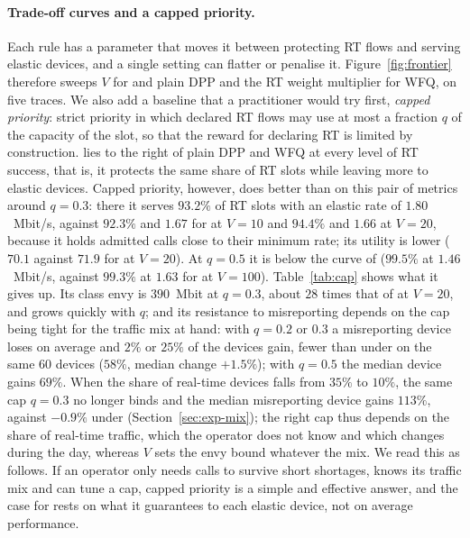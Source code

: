 \paragraph{Trade-off curves and a capped priority.}
Each rule has a parameter that moves it between protecting RT flows and serving elastic devices, and a single setting can flatter or penalise it.
Figure~\ref{fig:frontier} therefore sweeps $V$ for \repay{} and plain DPP and the RT weight multiplier for \textsc{WFQ}, on five traces.
We also add a baseline that a practitioner would try first, \emph{capped priority}: strict priority in which declared RT flows may use at most a fraction $q$ of the capacity of the slot, so that the reward for declaring RT is limited by construction.
\repay{} lies to the right of plain DPP and \textsc{WFQ} at every level of RT success, that is, it protects the same share of RT slots while leaving more to elastic devices.
Capped priority, however, does better than \repay{} on this pair of metrics around $q=0.3$: there it serves $93.2\%$ of RT slots with an elastic rate of $1.80$~Mbit/s, against $92.3\%$ and $1.67$ for \repay{} at $V=10$ and $94.4\%$ and $1.66$ at $V=20$, because it holds admitted calls close to their minimum rate; its utility is lower ($70.1$ against $71.9$ for \repay{} at $V=20$). At $q=0.5$ it is below the curve of \repay{} ($99.5\%$ at $1.46$~Mbit/s, against $99.3\%$ at $1.63$ for \repay{} at $V=100$).
Table~\ref{tab:cap} shows what it gives up.
Its class envy is $390$~Mbit at $q=0.3$, about $28$ times that of \repay{} at $V=20$, and grows quickly with $q$; and its resistance to misreporting depends on the cap being tight for the traffic mix at hand: with $q=0.2$ or $0.3$ a misreporting device loses on average and $2\%$ or $25\%$ of the devices gain, fewer than under \repay{} on the same $60$ devices ($58\%$, median change $+1.5\%$); with $q=0.5$ the median device gains $69\%$.
When the share of real-time devices falls from $35\%$ to $10\%$, the same cap $q=0.3$ no longer binds and the median misreporting device gains $113\%$, against $-0.9\%$ under \repay{} (Section~\ref{sec:exp-mix}); the right cap thus depends on the share of real-time traffic, which the operator does not know and which changes during the day, whereas $V$ sets the envy bound whatever the mix.
We read this as follows. If an operator only needs calls to survive short shortages, knows its traffic mix and can tune a cap, capped priority is a simple and effective answer, and the case for \repay{} rests on what it guarantees to each elastic device, not on average performance.

